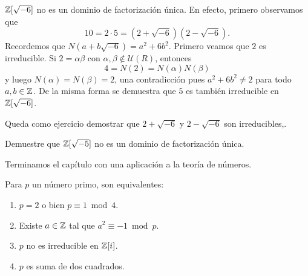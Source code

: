 

\begin{example}
$\mathbb{Z}[\sqrt{-6}]$ no es un dominio de factorización única. En efecto, primero observamos que 
\[
10=2\cdot 5=(2+\sqrt{-6})(2-\sqrt{-6}).
\]
Recordemos que $N(a+b\sqrt{-6})=a^2+6b^2$.	
Primero veamos que $2$ es irreducible. Si $2=\alpha\beta$ con $\alpha,\beta\not\in\mathcal{U}(R)$, entonces 
\[
4=N(2)=N(\alpha)N(\beta)
\]
y luego $N(\alpha)=N(\beta)=2$, una contradicción pues $a^2+6b^2\ne 2$ para todo $a,b\in\mathbb{Z}$. 
De la misma forma se demuestra que $5$ 
es también irreducible en $\mathbb{Z}[\sqrt{-6}]$. 

Queda como ejercicio demostrar que $2+\sqrt{-6}$ y $2-\sqrt{-6}$ son irreducibles,.
\end{example}

\begin{exercise}
Demuestre que $\mathbb{Z}[\sqrt{-5}]$ no es un dominio de factorización única.
\end{exercise}


Terminamos el capítulo con una aplicación a la teoría de números.

\begin{theorem}[Fermat]
Para $p$ un número primo, son equivalentes:
\begin{enumerate}
	\item $p=2$ o bien $p\equiv1\bmod 4$.
	\item Existe $a\in\mathbb{Z}$ tal que $a^2\equiv-1\bmod p$.
	\item $p$ no es irreducible en $\mathbb{Z}[i]$.
	\item $p$ es suma de dos cuadrados.
\end{enumerate}	
\end{theorem}


